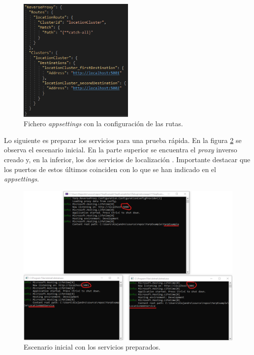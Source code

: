 \documentclass[11pt,spanish,listoffigures]{tfgetsinf}
\begin{document}
\begin{figure}[ht]
\centering
\includegraphics[width=0.50\textwidth]{imagenes/ejemploYARP/appsettings}
\caption{Fichero \emph{appsettings} con la configuración de las rutas.}
	\label{ejemploYARP_appsettings}
\end{figure}

Lo siguiente es preparar los servicios para una prueba rápida. En la figura \ref{ejemploYARP_servicios_preparacion} se observa el escenario inicial. En la parte superior se encuentra el \emph{proxy} inverso creado y, en la inferior, los dos servicios de localización . Importante destacar que los puertos de estos últimos coinciden con lo que se han indicado en el \emph{appsettings}.

\begin{figure}[ht]
\centering
\includegraphics[width=1\textwidth]{imagenes/ejemploYARP/servicios_preparacion}
\caption{Escenario inicial con los servicios preparados.}
	\label{ejemploYARP_servicios_preparacion}
\end{figure}
\end{document}
